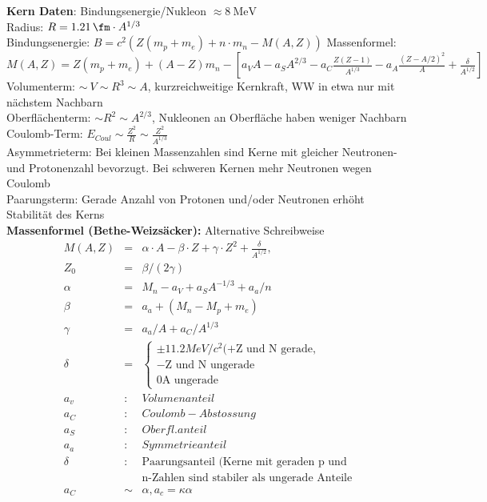 \documentclass[10pt,twoside,a4paper]{article}
\begin{document}
\begin{multicols*}{3}
\textbf{Kern Daten}: Bindungsenergie/Nukleon $\approx \SI{8}{\mega\eV}$ \\
Radius: $R = \SI{1.21}{\fm} \cdot A^{1/3}$ \\
Bindungsenergie: $B = c^2 \left( Z (m_p + m_e) + n \cdot m_n - M(A, Z) \right)$
Massenformel: $M\left( A, Z \right) = Z \left( m_p + m_e \right) + \left( A - Z \right) m_n - \left[ a_V A - a_S A^{2/3} - a_C \frac{Z(Z-1)}{A^{1/3}} - a_A \frac{(Z - A/2)^2}{A} + \frac{\delta}{A^{1/2}} \right]$ \\
Volumenterm: $\sim\ V \sim R^3 \sim A$, kurzreichweitige Kernkraft, WW in etwa nur mit nächstem Nachbarn \\
Oberflächenterm: $\sim R^2 \sim A^{2/3}$, Nukleonen an Oberfläche haben weniger Nachbarn \\
Coulomb-Term: $E_{Coul} \sim \frac{Z^2}{R} \sim \frac{Z^2}{A^{1/3}}$ \\
Asymmetrieterm: Bei kleinen Massenzahlen sind Kerne mit gleicher Neutronen- und Protonenzahl bevorzugt. Bei schweren Kernen mehr Neutronen wegen Coulomb \\
Paarungsterm: Gerade Anzahl von Protonen und/oder Neutronen erhöht Stabilität des Kerns \\

\textbf{Massenformel (Bethe-Weizsäcker):} 
Alternative Schreibweise
\begin{eqnarray*}
M(A,Z) &=& \alpha\cdot A - \beta \cdot Z + \gamma \cdot Z^2+\frac{\delta}{A^{1/2}},\\
 Z_0 &=& \beta/(2\gamma)\\
\alpha &=& M_n - a_V + a_SA^{-1/3} + a_a/n\\
\beta &=& a_a + (M_n - M_p + m_e)\\
\gamma &=& a_a/A + a_C/A^{1/3}\\
\delta &=& \begin{cases}
\pm 11.2 MeV/c^2 (+ \text{Z und N gerade},\\
 - \text{Z und N ungerade}\\
0 \text{A ungerade}
\end{cases}\\
a_v &:& Volumenanteil\\
a_C &:& Coulomb-Abstossung\\
a_S &:&Oberfl.anteil\\
a_a &:&Symmetrieanteil\\
\delta &:&\text{Paarungsanteil (Kerne mit geraden p und }\\~&~&\text{n-Zahlen sind stabiler als ungerade Anteile}\\
a_C &\sim& \alpha, a_c = \kappa \alpha 
\end{eqnarray*}



\end{multicols*}
\end{document}
